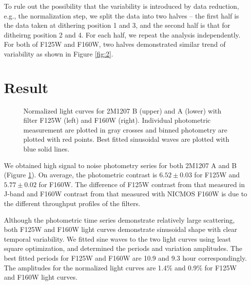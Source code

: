 \documentclass[apj]{emulateapj}
\begin{document}
 To rule out the possibility that the variability is introduced by
 data reduction, e.g., the normalization step, we split the data into
 two halves -- the first half is the data taken at dithering position 1
 and 3, and the second half is that for ditheirng position 2 and
 4. For each half, we repeat the analysis independently. For both of
 F125W and F160W, two halves demonstrated similar trend of
 variability as shown in Figure \ref{fig:2}.

\section{Result}

\begin{figure}
  \centering
  \caption{Normalized light curves for 2M1207 B (upper) and A (lower)
    with filter F125W (left) and F160W (right). Individual photometric
  measurement are plotted in gray crosses and binned photometry are
  plotted with red points. Best fitted sinusoidal waves are plotted
  with blue solid lines.}
  \label{fig:3}
\end{figure}

We obtained high signal to noise photometry series for both 2M1207 A
and B (Figure \ref{fig:3}). On average, the photometric contrast is $6.52\pm0.03$ for
F125W and $5.77\pm0.02$ for F160W. The difference of F125W contrast
from that measured in J-band \citep{Mohanty2007} and
F160W contrast from that measured with NICMOS F160W 
\citep{Song2006} is due to the different throughput profiles of the
filters.

Although the photometric time series demonstrate relatively large
scattering, both F125W and F160W light curves demonstrate sinusoidal
shape with clear temporal variability. We fitted sine waves to the two
light curves using least square optimization, and determined the
periods and variation amplitudes. The best fitted periods for F125W
and F160W are 10.9 and 9.3 hour correspondingly. The amplitudes for
the normalized light curves are 1.4\% and 0.9\% for F125W and F160W
light curves.
\end{document}
